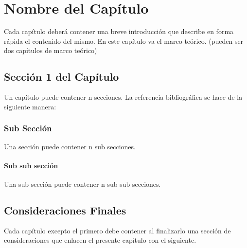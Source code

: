 \chapter{Nombre del Capítulo}

Cada capítulo deberá contener una breve introducción que describe en forma rápida el contenido del
mismo. En este capítulo va el marco teórico. (pueden ser dos capítulos de marco teórico)

\section{Sección 1 del Capítulo}

Un capítulo puede contener n secciones. La referencia bibliográfica se hace de la siguiente manera:
\cite{Mateos00}

\subsection{Sub Sección}

Una sección puede contener n sub secciones.\cite{Galante01}

\subsubsection{Sub sub sección}

Una sub sección puede contener n sub sub secciones.
\section{Consideraciones Finales}

Cada capítulo excepto el primero debe contener al finalizarlo una sección de consideraciones que enlacen
el presente capítulo con el siguiente.
